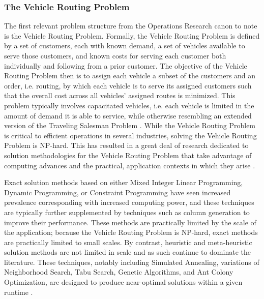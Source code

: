\documentclass[11pt,twoside]{article}
\numberwithin{Theorem}{section}
\numberwithin{Definition}{section}
\numberwithin{Lemma}{section}
\numberwithin{Algorithm}{section}
\numberwithin{equation}{section}
\begin{document}
\subsubsection{The Vehicle Routing Problem}
The first relevant problem structure from the Operations Research canon to note is the Vehicle Routing Problem. Formally, the Vehicle Routing Problem is defined by a set of customers, each with known demand, a set of vehicles available to serve those customers, and known costs for serving each customer both individually and following from a prior customer. The objective of the Vehicle Routing Problem then is to assign each vehicle a subset of the customers and an order, i.e. routing, by which each vehicle is to serve its assigned customers such that the overall cost across all vehicles' assigned routes is minimized. This problem typically involves capacitated vehicles, i.e. each vehicle is limited in the amount of demand it is able to service, while otherwise resembling an extended version of the Traveling Salesman Problem \cite{NELSON1985}. While the Vehicle Routing Problem is critical to efficient operations in several industries, solving the Vehicle Routing Problem is NP-hard. This has resulted in a great deal of research dedicated to solution methodologies for the Vehicle Routing Problem that take advantage of computing advances and the practical, application contexts in which they arise \cite{TanetYeh}. 

Exact solution methods based on either Mixed Integer Linear Programming, Dynamic Programming, or Constraint Programming have seen increased prevalence corresponding with increased computing power, and these techniques are typically further supplemented by techniques such as column generation to improve their performance. These methods are practically limited by the scale of the application; because the Vehicle Routing Problem is NP-hard, exact methods are practically limited to small scales. By contrast, heuristic and meta-heuristic solution methods are not limited in scale and as such continue to dominate the literature. These techniques, notably including Simulated Annealing, variations of Neighborhood Search, Tabu Search, Genetic Algorithms, and Ant Colony Optimization, are designed to produce near-optimal solutions within a given runtime \cite{TanetYeh}. 
\end{document}
